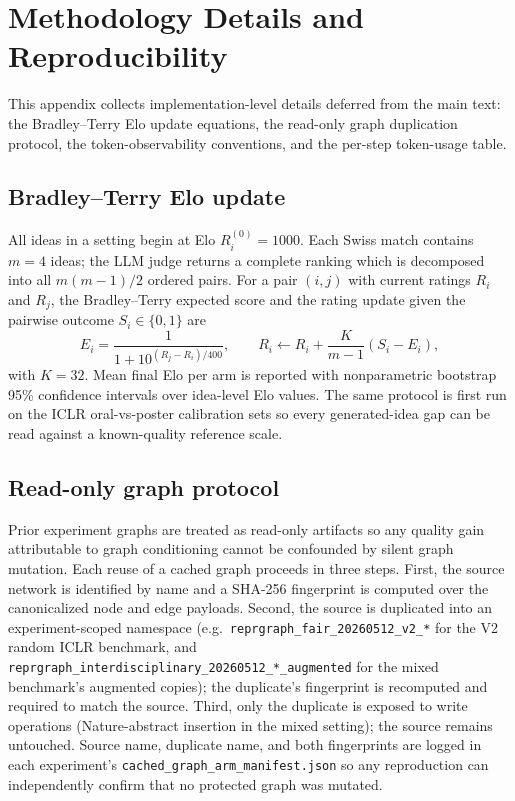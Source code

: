 \documentclass[10pt,twocolumn]{article}
\begin{document}
\clearpage
\onecolumn
\appendix

\section{Methodology Details and Reproducibility}
\label{app:method-details}

This appendix collects implementation-level details deferred from the
main text: the Bradley--Terry Elo update equations, the read-only
graph duplication protocol, the token-observability conventions, and
the per-step token-usage table.

\subsection{Bradley--Terry Elo update}

All ideas in a setting begin at Elo $R_i^{(0)} = 1000$.  Each Swiss
match contains $m=4$ ideas; the LLM judge returns a complete ranking
which is decomposed into all $m(m-1)/2$ ordered pairs.  For a pair
$(i,j)$ with current ratings $R_i$ and $R_j$, the Bradley--Terry
expected score \citep{bradley1952rank} and the rating update given the
pairwise outcome $S_i \in \{0,1\}$ are
\begin{equation}
  E_i = \frac{1}{1 + 10^{(R_j - R_i)/400}},
  \qquad
  R_i \leftarrow R_i + \frac{K}{m-1}(S_i - E_i),
\end{equation}
with $K = 32$.  Mean final Elo per arm is reported with nonparametric
bootstrap 95\% confidence intervals over idea-level Elo values.  The
same protocol is first run on the ICLR oral-vs-poster calibration sets
so every generated-idea gap can be read against a known-quality
reference scale.

\subsection{Read-only graph protocol}

Prior experiment graphs are treated as read-only artifacts so any
quality gain attributable to graph conditioning cannot be confounded
by silent graph mutation.  Each reuse of a cached graph proceeds in
three steps.  First, the source network is identified by name and a
SHA-256 fingerprint is computed over the canonicalized node and edge
payloads.  Second, the source is duplicated into an experiment-scoped
namespace (e.g.\ \texttt{reprgraph\_fair\_20260512\_v2\_*} for the V2
random ICLR benchmark, and
\texttt{reprgraph\_interdisciplinary\_20260512\_*\_augmented} for the
mixed benchmark's augmented copies); the duplicate's fingerprint is
recomputed and required to match the source.  Third, only the
duplicate is exposed to write operations (Nature-abstract insertion
in the mixed setting); the source remains untouched.  Source name,
duplicate name, and both fingerprints are logged in each experiment's
\texttt{cached\_graph\_arm\_manifest.json} so any reproduction can
independently confirm that no protected graph was mutated.
\end{document}
